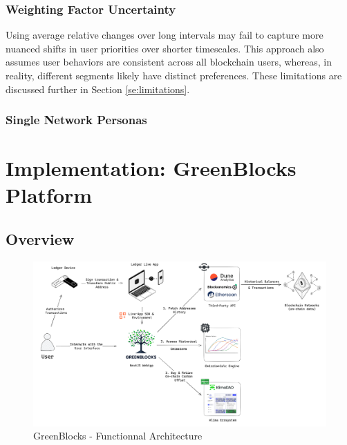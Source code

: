 \documentclass[11pt]{report}
\begin{document}
\subsection*{Weighting Factor Uncertainty}
Using average relative changes over long intervals may fail to capture more nuanced shifts in user priorities over shorter timescales. This approach also assumes user behaviors are consistent across all blockchain users, whereas, in reality, different segments likely have distinct preferences. These limitations are discussed further in Section \ref{se:limitations}.


\subsection*{Single Network Personas}





\chapter{Implementation: GreenBlocks Platform}
\section{Overview \label{se:implementation_overview}}
\begin{figure}[h!]
    \centering
    \centerline{\includegraphics[scale=0.08]{figures/functionnal architecture.png}}
    \caption{GreenBlocks - Functionnal Architecture}
    \label{fig:functionnal_architecture}
\end{figure}
\end{document}
